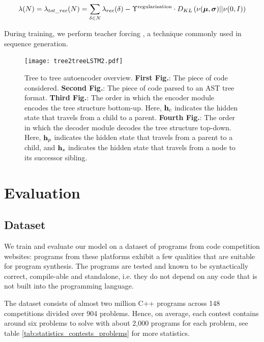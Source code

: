 \begin{align}
    \lambda(N) = \lambda_{tot\_rec}(N) = \sum_{\delta \in N}\lambda_{rec}(\delta) - \Upsilon^\text{regularization} \cdot D_{KL}\left(\nu(\boldsymbol\mu,\boldsymbol\sigma)||\nu(0,I)\right)
\end{align}

During training, we perform teacher forcing \cite[section 11.6.6]{kolenFieldGuideDynamical2001}, a technique commonly used in sequence generation.

\begin{figure}
    \centering
    \texttt{[image: tree2treeLSTM2.pdf]}
    \caption[Tree2Tree model high-level overview]{Tree to tree autoencoder overview. \textbf{First Fig.}: The piece of code considered. \textbf{Second Fig.}: The piece of code parsed to an AST tree format. \textbf{Third Fig.}: The order in which the encoder module encodes the tree structure bottom-up. Here, $\mathbf{h}_c$ indicates the hidden state that travels from a child to a parent. \textbf{Fourth Fig.}: The order in which the decoder module decodes the tree structure top-down. Here, $\mathbf{h}_p$ indicates the hidden state that travels from a parent to a child, and $\mathbf{h}_s$ indicates the hidden state that travels from a node to its successor sibling.}
    \label{fig:tree2treeVAE}
\end{figure}

\newpage
\section{Evaluation}
\label{sec:tree2tree-eval}

\subsection{Dataset}
\label{sec:tree2tree-dataset}
We train and evaluate our model on a dataset of programs from code competition websites: programs from these platforms exhibit a few qualities that are suitable for program synthesis. The programs are tested and known to be syntactically correct, compile-able and standalone, i.e. they do not depend on any code that is not built into the programming language. 

The dataset consists of almost two million C++ programs across 148 competitions divided over 904 problems. 
Hence, on average, each contest contains around six problems to solve with about 2,000 programs for each problem, see table \ref{tab:statistics_contests_problems} for more statistics. 

